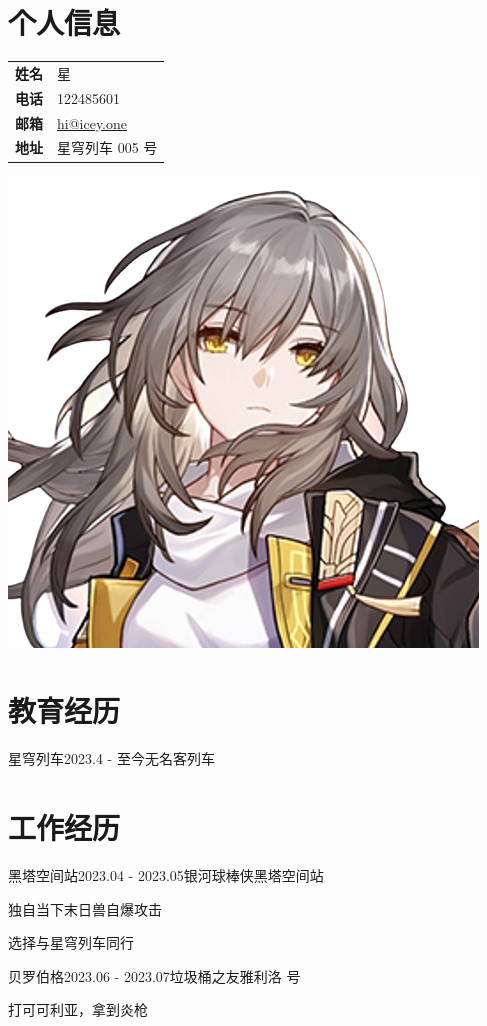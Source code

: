 \documentclass{University_resume}
\begin{document}
\section{个人信息}
\begin{minipage}{0.75\textwidth}
        \begin{tabular}{ll}
        \textbf{姓名} & 星         \\
        \textbf{电话} & 122485601     \\
        \textbf{邮箱} & \href{mailto:hi@icey.one}{hi@icey.one} \\
        \textbf{地址} & 星穹列车 005 号 
        \end{tabular}
\end{minipage}
\hfill
\begin{minipage}{0.3\textwidth}
    \includegraphics[height=0.5\textwidth]{images/avatar.png}
\end{minipage}
\section{教育经历}

\begin{cSubsection}{星穹列车}{2023.4 - 至今}{无名客}{列车}
\end{cSubsection}

\section{工作经历}

\begin{rSubsection}
    {黑塔空间站}{2023.04 - 2023.05}{银河球棒侠}{黑塔空间站}
    \item 独自当下末日兽自爆攻击
    \item 选择与星穹列车同行
\end{rSubsection}

\begin{rSubsection}
    {贝罗伯格}{2023.06 - 2023.07}{垃圾桶之友}{雅利洛  号}
    \item 打可可利亚，拿到炎枪
\end{rSubsection}
\end{document}
